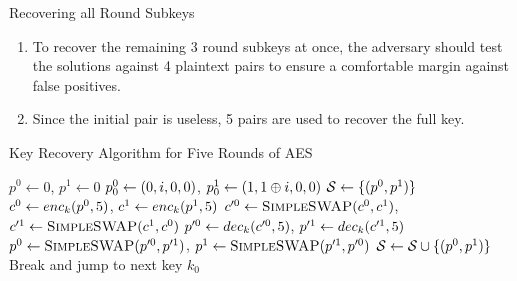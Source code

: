 \documentclass[notheorems]{beamer}
\theoremstyle{definition}
\theoremstyle{example}
\begin{document}
    \begin{frame}[<+->]{Recovering all Round Subkeys}
        \begin{enumerate}
            \item To recover the remaining 3 round subkeys at once, the
            adversary should test the solutions against 4 plaintext pairs to
            ensure a comfortable margin against false positives. 
            \item Since the initial pair is useless, 5 pairs are used to recover
            the full key.
        \end{enumerate} 
    \end{frame}

    \begin{frame}{Key Recovery Algorithm for Five Rounds of AES}
        \vspace{-1em}
        \begin{algorithm}[H]
            \label{alg:aes-5-rounds-key}
            \algrenewcommand{}
            \scriptsize
            \caption{Key Recovery for Five Rounds of AES}
            \begin{algorithmic}[1]
                    \State \(p^0 \gets 0\), \(p^1 \gets 0\)
                    \State \(p_0^0 \gets (0, i, 0, 0)\), \(p_0^1 \gets
                    (1, 1 \oplus i, 0, 0)\)
                    \State \(\mathcal S \gets \{(p^0, p^1)\}\)
                        \State \(c^0 \gets enc_k(p^0, 5)\), \(c^1 \gets
                        enc_k(p^1, 5)\)
                        \State \(c^{\prime 0} \gets
                        \textsc{SimpleSWAP}(c^0, c^1)\), \(c^{\prime 1}
                        \gets \textsc{SimpleSWAP}(c^1, c^0)\)
                        \State \(p^{\prime 0} \gets dec_k(c^{\prime 0},
                        5)\), \(p^{\prime 1} \gets dec_k(c^{\prime 1}, 5)\)
                        \State \(p^0 \gets \textsc{SimpleSWAP}(p^{\prime
                        0}, p^{\prime 1})\), \(p^1 \gets
                        \textsc{SimpleSWAP}(p^{\prime 1}, p^{\prime 0})\)
                        \State \(\mathcal S \gets \mathcal S \cup \{(p^0, p^1)\}\)
                    \EndWhile
                                \State Break and jump to next key
                            \EndIf
                        \EndFor
                        \State \Return \(k_0\)
                    \EndFor
                \EndFor
            \end{algorithmic}
        \end{algorithm}
    \end{frame}
\end{document}
